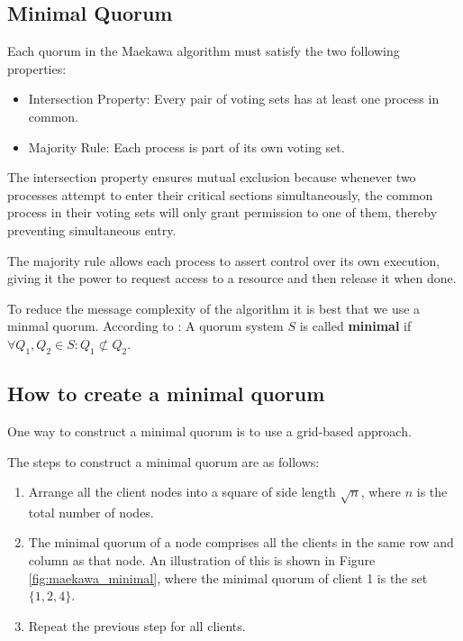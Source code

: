 \subsection{Minimal Quorum}
Each quorum in the Maekawa algorithm must satisfy the two following properties:

\begin{itemize}
 \item Intersection Property: Every pair of voting sets has at least one process in common. 
 \item Majority Rule: Each process is part of its own voting set.
\end{itemize}
The intersection property ensures mutual exclusion because whenever two processes 
attempt to enter their critical sections simultaneously, the common process in their voting sets will only grant permission to one of them, thereby preventing simultaneous entry.

The majority rule allows each process to assert control over its own execution, giving it the power to request access to a resource and then release it when done.

To reduce the message complexity of the algorithm it is best that we use a minmal 
quorum. According to \cite{eth_quorum}: A quorum system $S$ is called \textbf{minimal}
if $\forall Q_1, Q_2 \in S: Q_1 \not\subset Q_2$.



\subsection{How to create a minimal quorum}

One way to construct a minimal quorum is to use a grid-based approach.

The steps to construct a minimal quorum are as follows:

\begin{enumerate}
\item Arrange all the client nodes into a square of side length $\sqrt{n}$, where $n$ is the total number of nodes.
\item The minimal quorum of a node comprises all the clients in the same row 
  and column as that node. An illustration of this is shown in Figure 
  \ref{fig:maekawa_minimal}, where the minimal quorum of client 1 is the set $\{1,2,4\}$.
\item Repeat the previous step for all clients.
\end{enumerate}


